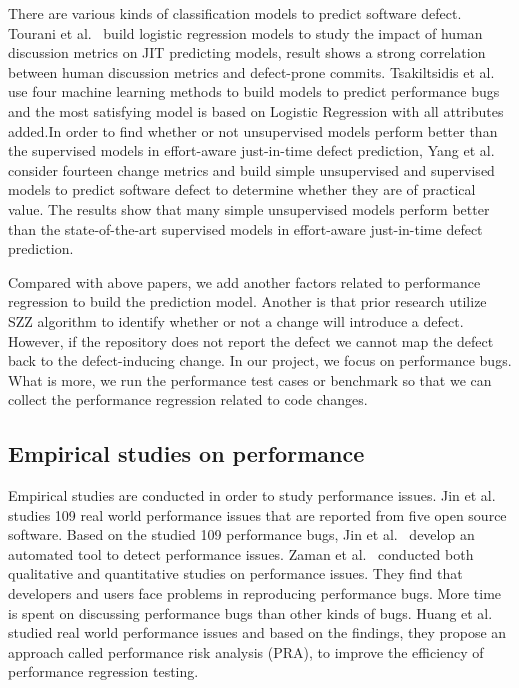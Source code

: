 There are various kinds of classification models to predict software defect. Tourani et al.~\cite{tourani2016impact} build logistic regression models to study the impact of human discussion metrics on JIT predicting models, result shows a strong correlation between human discussion metrics and defect-prone commits.  Tsakiltsidis et al.~\cite{tsakiltsidis2016automatic} use four machine learning methods to build models to predict performance bugs and the most satisfying model is based on Logistic Regression with all attributes added.In order to find whether or not unsupervised models perform better than the supervised models in effort-aware just-in-time defect prediction, Yang et al.~\cite{Yang:2016:EJD} consider fourteen change metrics and build simple unsupervised and supervised models to predict software defect to determine whether they are of practical value. The results show that many simple unsupervised models perform better than the state-of-the-art supervised models in effort-aware just-in-time defect prediction. 

 Compared with above papers, we add another factors related to performance regression to build the prediction model. Another is that prior research utilize SZZ algorithm to identify whether or not a change will introduce a defect. However, if the repository does not report the defect we cannot map the defect back to the defect-inducing change. In our project, we focus on performance bugs. What is more, we run the performance test cases or benchmark so that we can collect the performance regression related to code changes.

\subsection{Empirical studies on performance}
Empirical studies are conducted in order to study performance issues. Jin et al.~\cite{Jin:2012} studies 109 real world performance issues that are reported from five open source software. Based on the studied 109 performance bugs, Jin et al.~\cite{Jin:2012} develop an automated tool to detect performance issues. Zaman et al.~\cite{MSR11:Zaman,MSR12:Zaman} conducted both qualitative and quantitative studies on performance issues. They find that developers and users face problems in reproducing performance bugs. More time is spent on discussing performance bugs than other kinds of bugs. Huang et al.~\cite{ICSE2014:Huang} studied real world performance issues and based on the findings, they propose an approach called performance risk analysis (PRA), to improve the efficiency of performance regression testing. 

